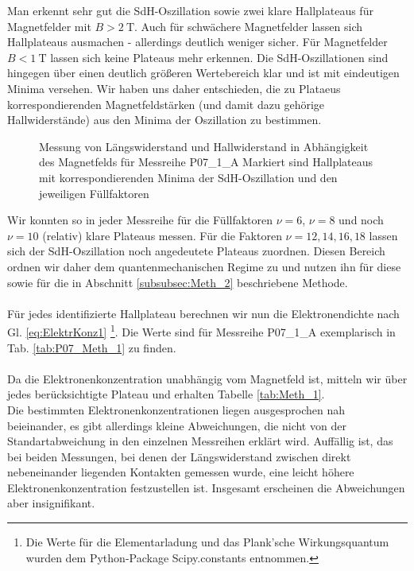 Man erkennt sehr gut die SdH-Oszillation sowie zwei klare Hallplateaus für Magnetfelder mit $B>\SI{2}{\tesla}$. Auch für schwächere Magnetfelder lassen sich Hallplateaus ausmachen - allerdings deutlich weniger sicher. Für Magnetfelder $B<\SI{1}{\tesla}$ lassen sich keine Plateaus mehr erkennen. Die SdH-Oszillationen sind hingegen über einen deutlich größeren Wertebereich klar und ist mit eindeutigen Minima versehen. Wir haben uns daher entschieden, die zu Plataeus korrespondierenden Magnetfeldstärken (und damit dazu gehörige Hallwiderstände) aus den Minima der Oszillation zu bestimmen.

\begin{figure}[h!]
	\centering
	
	\caption{Messung von Längswiderstand und Hallwiderstand in Abhängigkeit des Magnetfelds für Messreihe P07\_1\_A Markiert sind Hallplateaus mit korrespondierenden Minima der SdH-Oszillation und den jeweiligen Füllfaktoren}
	\label{abb:P07_Meth_1}
\end{figure}

Wir konnten so in jeder Messreihe für die Füllfaktoren $\nu = 6$, $\nu = 8$ und noch $\nu = 10 $ (relativ) klare Plateaus messen. Für die Faktoren $\nu = 12, 14, 16, 18$ lassen sich der SdH-Oszillation noch angedeutete Plateaus zuordnen. Diesen Bereich ordnen wir daher dem quantenmechanischen Regime zu und nutzen ihn für diese sowie für die in Abschnitt \ref{subsubsec:Meth_2} beschriebene Methode. \\
\\
Für jedes identifizierte Hallplateau berechnen wir nun die Elektronendichte nach Gl. \ref{eq:ElektrKonz1} \footnote{Die Werte für die Elementarladung und das Plank'sche Wirkungsquantum wurden dem Python-Package Scipy.constants entnommen.}. Die Werte sind für Messreihe P07\_1\_A exemplarisch in Tab. \ref{tab:P07_Meth_1} zu finden. \\
\\
Da die Elektronenkonzentration unabhängig vom Magnetfeld ist, mitteln wir über jedes berücksichtigte Plateau und erhalten Tabelle \ref{tab:Meth_1}. \\ 

Die bestimmten Elektronenkonzentrationen liegen ausgesprochen nah beieinander, es gibt allerdings kleine Abweichungen, die nicht von der Standartabweichung in den einzelnen Messreihen erklärt wird. Auffällig ist, das bei beiden Messungen, bei denen der Längswiderstand zwischen direkt nebeneinander liegenden Kontakten gemessen wurde, eine leicht höhere Elektronenkonzentration festzustellen ist. Insgesamt erscheinen die Abweichungen aber insignifikant. \\

